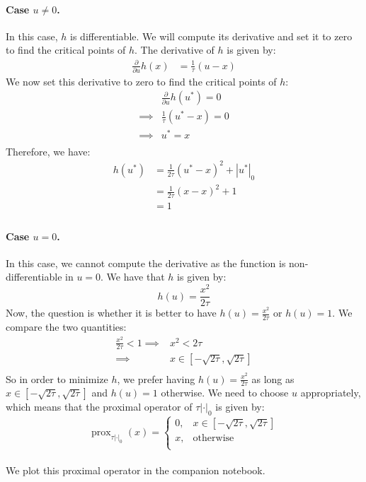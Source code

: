 \documentclass[12pt]{article}
\newcommand{\prox}{\operatorname{prox}}
\begin{document}
\paragraph{Case $u \neq 0$.}
In this case, $h$ is differentiable. We will compute its derivative and set it to zero to find the critical points of $h$. The derivative of $h$ is given by:
\begin{align*}
  \frac{\partial}{\partial u} h(x)
   & = \frac{1}{\tau} (u-x)
\end{align*}
We now set this derivative to zero to find the critical points of $h$:
\begin{align*}
           &
  \frac{\partial}{\partial u}  h(u^*) = 0 \\
  \implies &
  \frac{1}{\tau} (u^*-x) = 0              \\
  \implies &
  u^* = x                                 \\
\end{align*}
Therefore, we have:
\begin{align*}
  h(u^*)
   & = \frac{1}{2\tau}\left(u^* - x \right)^2 + |u^*|_0 \\
   & = \frac{1}{2\tau}\left(x - x \right)^2 + 1         \\
   & = 1                                                \\
\end{align*}
\paragraph{Case $u = 0$.}
In this case, we cannot compute the derivative as the function is non-differentiable in $u = 0$. We have that $h$ is given by:
\begin{equation*}
  h(u) = \frac{x^2}{2\tau}
\end{equation*}
Now, the question is whether it is better to have $h(u) = \frac{x^2}{2\tau}$ or $h(u) = 1$. We compare the two quantities:
\begin{align*}
  \frac{x^2}{2\tau} < 1
  \implies &
  x^2 < 2\tau                         \\
  \implies &
  x \in [-\sqrt{2\tau}, \sqrt{2\tau}] \\
\end{align*}
So in order to minimize $h$, we prefer having $h(u) = \frac{x^2}{2\tau}$ as long as $x \in [-\sqrt{2\tau}, \sqrt{2\tau}]$ and $h(u) = 1$ otherwise. We need to choose $u$ appropriately, which means that the proximal operator of $\tau |\cdot|_0$ is given by:
\begin{equation*}
  \prox_{\tau |\cdot|_0}(x) = \begin{cases}
    0, & x \in [-\sqrt{2\tau}, \sqrt{2\tau}] \\
    x, & \text{otherwise}                    \\
  \end{cases}
\end{equation*}
\\We plot this proximal operator in the companion notebook.
\end{document}
